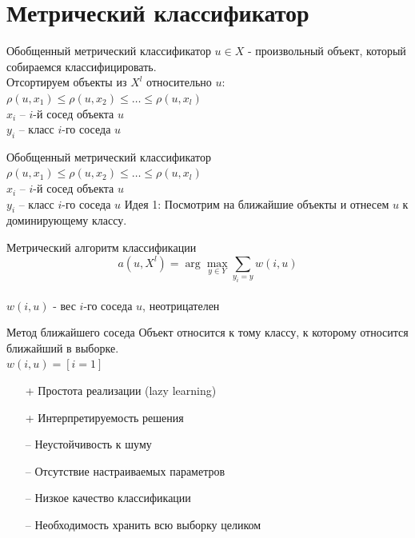 \documentclass[10pt]{beamer}
\begin{document}
\section{Метрический классификатор}

\begin{frame}{Обобщенный метрический классификатор}
	$u \in X$ - произвольный объект, который собираемся классифицировать.\\
	\bigbreak
	\pause
	Отсортируем объекты из $X^l$ относительно $u$:
	${\rho(u, x_1) \leq \rho(u, x_2) \leq \dots \leq \rho(u, x_l)}$\\
	\bigbreak
	${x_i}$ -- $i$-й сосед объекта $u$\\
	${y_i}$ -- класс $i$-го соседа $u$
\end{frame}

\begin{frame}{Обобщенный метрический классификатор}
	${\rho(u, x_1) \leq \rho(u, x_2) \leq \dots \leq \rho(u, x_l)}$\\
	\bigbreak
	${x_i}$ -- $i$-й сосед объекта $u$\\
	${y_i}$ -- класс $i$-го соседа $u$
  \bigbreak
  \pause
  \alert{Идея 1}: Посмотрим на ближайшие объекты и отнесем $u$ к доминирующему классу. 
\end{frame}

\begin{frame}{Метрический алгоритм классификации}
	$${a(u, X^l) = \arg\max\limits_{y \in Y} \sum\limits_{y_i = y} w(i, u)}$$\\
	\bigbreak
	\bigbreak	
	$w(i, u)$ - вес $i$-го соседа $u$, неотрицателен\\
\end{frame}

\begin{frame}{Метод ближайшего соседа}
  Объект относится к тому классу, к которому относится ближайший в выборке.\\
  	\bigbreak
	\bigbreak
	${w(i, u) = [i=1]}$\\
	\bigbreak
	\pause
	\begin{itemize} [<+- | alert@+>]
		\item[+] Простота реализации (lazy learning)
		\item[+] Интерпретируемость решения
	  \bigbreak
		\item[--	] Неустойчивость к шуму
		\item[--	] Отсутствие настраиваемых параметров
		\item[--	] Низкое качество классификации
		\item[--	] Необходимость хранить всю выборку целиком		
	\end{itemize}
\end{frame}
\end{document}
